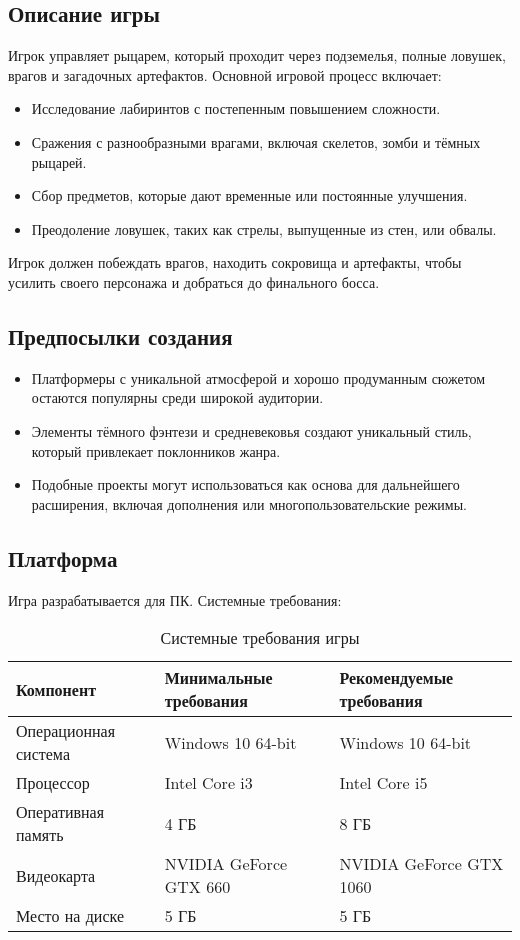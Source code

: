 \documentclass{article}
\begin{document}
\subsection{Описание игры}
Игрок управляет рыцарем, который проходит через подземелья, полные ловушек, врагов и загадочных артефактов. Основной игровой процесс включает:
\begin{itemize}
    \item Исследование лабиринтов с постепенным повышением сложности.
    \item Сражения с разнообразными врагами, включая скелетов, зомби и тёмных рыцарей.
    \item Сбор предметов, которые дают временные или постоянные улучшения.
    \item Преодоление ловушек, таких как стрелы, выпущенные из стен, или обвалы.
\end{itemize}
Игрок должен побеждать врагов, находить сокровища и артефакты, чтобы усилить своего персонажа и добраться до финального босса.

\subsection{Предпосылки создания}
\begin{itemize}
    \item Платформеры с уникальной атмосферой и хорошо продуманным сюжетом остаются популярны среди широкой аудитории.
    \item Элементы тёмного фэнтези и средневековья создают уникальный стиль, который привлекает поклонников жанра.
    \item Подобные проекты могут использоваться как основа для дальнейшего расширения, включая дополнения или многопользовательские режимы.
\end{itemize}

\subsection{Платформа}
Игра разрабатывается для ПК. Системные требования:
\begin{table}[h!]
\centering
\begin{tabular}{|l|l|l|}
\hline
\textbf{Компонент} & \textbf{Минимальные требования} & \textbf{Рекомендуемые требования} \\ \hline
Операционная система & Windows 10 64-bit & Windows 10 64-bit \\ \hline
Процессор & Intel Core i3 & Intel Core i5 \\ \hline
Оперативная память & 4 ГБ & 8 ГБ \\ \hline
Видеокарта & NVIDIA GeForce GTX 660 & NVIDIA GeForce GTX 1060 \\ \hline
Место на диске & 5 ГБ & 5 ГБ \\ \hline
\end{tabular}
\caption{Системные требования игры}
\label{}
\end{table}
\end{document}
